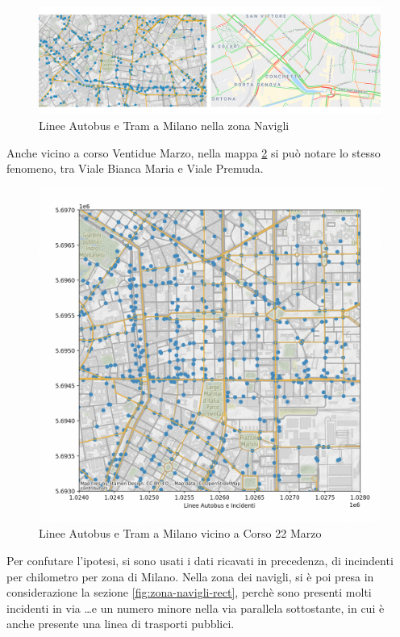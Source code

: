 \documentclass[a4paper]{report}
\begin{document}
\begin{figure}
    \includegraphics[width=\linewidth]{../src/atm/navigli.png}
    \caption{Linee Autobus e Tram a Milano nella zona Navigli}
    \label{fig:navigli}
\end{figure}

Anche vicino a corso Ventidue Marzo, nella mappa \ref{fig:22-marzo} si può 
notare lo stesso fenomeno, tra Viale Bianca Maria e Viale Premuda.

\begin{figure}
    \includegraphics[width=\linewidth]{../src/atm/22_marzo.png}
    \caption{Linee Autobus e Tram a Milano vicino a Corso 22 Marzo}
    \label{fig:22-marzo}
\end{figure}

Per confutare l'ipotesi, si sono usati i dati ricavati in precedenza, 
di incindenti per chilometro per zona di Milano. 
Nella zona dei navigli, si è poi presa in considerazione la sezione \ref{fig:zona-navigli-rect}, 
perchè sono presenti molti incidenti in via \dots e un numero minore nella via parallela sottostante, 
in cui è anche presente una linea di trasporti pubblici.
\end{document}
